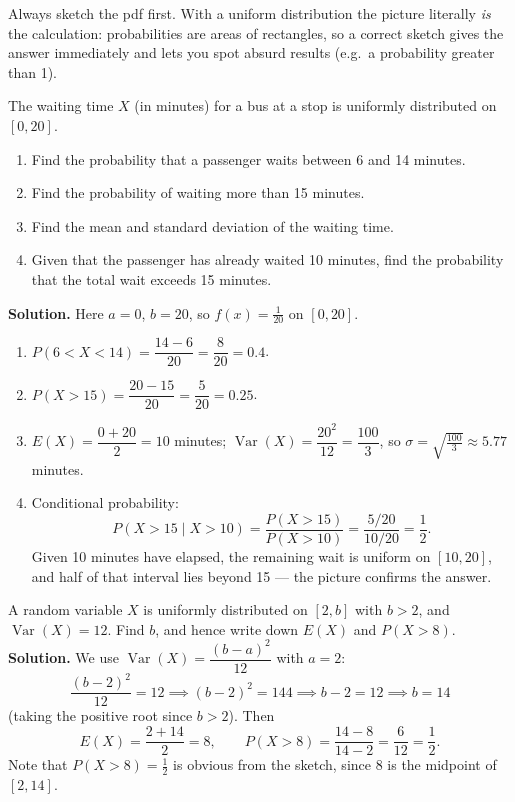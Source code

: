 \documentclass[11pt]{article}
\begin{document}
\begin{exemplebox}
Always sketch the pdf first. With a uniform distribution the picture literally \emph{is} the calculation: probabilities are areas of rectangles, so a correct sketch gives the answer immediately and lets you spot absurd results (e.g.\ a probability greater than 1).
\end{exemplebox}

\begin{exoresolu}
The waiting time $X$ (in minutes) for a bus at a stop is uniformly distributed on $[0, 20]$.
\begin{enumerate}
\item Find the probability that a passenger waits between 6 and 14 minutes.
\item Find the probability of waiting more than 15 minutes.
\item Find the mean and standard deviation of the waiting time.
\item Given that the passenger has already waited 10 minutes, find the probability that the total wait exceeds 15 minutes.
\end{enumerate}
\tcblower
\textbf{Solution.} Here $a = 0$, $b = 20$, so $f(x) = \tfrac{1}{20}$ on $[0,20]$.
\begin{enumerate}
\item $P(6 < X < 14) = \dfrac{14 - 6}{20} = \dfrac{8}{20} = 0.4$.
\item $P(X > 15) = \dfrac{20 - 15}{20} = \dfrac{5}{20} = 0.25$.
\item $E(X) = \dfrac{0 + 20}{2} = 10$ minutes; $\operatorname{Var}(X) = \dfrac{20^2}{12} = \dfrac{100}{3}$, so $\sigma = \sqrt{\tfrac{100}{3}} \approx 5.77$ minutes.
\item Conditional probability:
\[
P(X > 15 \mid X > 10) = \frac{P(X > 15)}{P(X > 10)} = \frac{5/20}{10/20} = \frac{1}{2}.
\]
Given 10 minutes have elapsed, the remaining wait is uniform on $[10, 20]$, and half of that interval lies beyond 15 — the picture confirms the answer.
\end{enumerate}
\end{exoresolu}

\begin{exoresolu}
A random variable $X$ is uniformly distributed on $[2, b]$ with $b > 2$, and $\operatorname{Var}(X) = 12$. Find $b$, and hence write down $E(X)$ and $P(X > 8)$.
\tcblower
\textbf{Solution.} We use $\operatorname{Var}(X) = \dfrac{(b-a)^2}{12}$ with $a = 2$:
\[
\frac{(b-2)^2}{12} = 12 \implies (b-2)^2 = 144 \implies b - 2 = 12 \implies b = 14
\]
(taking the positive root since $b > 2$). Then
\[
E(X) = \frac{2 + 14}{2} = 8, \qquad P(X > 8) = \frac{14 - 8}{14 - 2} = \frac{6}{12} = \frac{1}{2}.
\]
Note that $P(X > 8) = \tfrac12$ is obvious from the sketch, since $8$ is the midpoint of $[2, 14]$.
\end{exoresolu}
\end{document}
